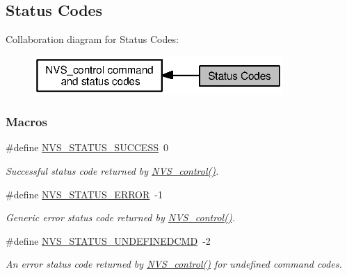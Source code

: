 \subsection{Status Codes}
\label{group___n_v_s___s_t_a_t_u_s}
Collaboration diagram for Status Codes\+:
\nopagebreak
\begin{figure}[H]
\begin{center}
\leavevmode
\includegraphics[width=269pt]{group___n_v_s___s_t_a_t_u_s}
\end{center}
\end{figure}
\subsubsection*{Macros}
\begin{DoxyCompactItemize}
\item 
\#define \hyperlink{group___n_v_s___s_t_a_t_u_s_ga5f3b6583ee909863b86799762dc8b4aa}{N\+V\+S\+\_\+\+S\+T\+A\+T\+U\+S\+\_\+\+S\+U\+C\+C\+E\+S\+S}~0
\begin{DoxyCompactList}\small\item\em Successful status code returned by \hyperlink{_n_v_s_8h_adb26bd05e4f063191411ac5ad968b1d9}{N\+V\+S\+\_\+control()}. \end{DoxyCompactList}\item 
\#define \hyperlink{group___n_v_s___s_t_a_t_u_s_ga995c9896630b7a0cd1662e7be9c4cf34}{N\+V\+S\+\_\+\+S\+T\+A\+T\+U\+S\+\_\+\+E\+R\+R\+O\+R}~-\/1
\begin{DoxyCompactList}\small\item\em Generic error status code returned by \hyperlink{_n_v_s_8h_adb26bd05e4f063191411ac5ad968b1d9}{N\+V\+S\+\_\+control()}. \end{DoxyCompactList}\item 
\#define \hyperlink{group___n_v_s___s_t_a_t_u_s_gac8aa59663f65af4fa564a3a83cd7d6e1}{N\+V\+S\+\_\+\+S\+T\+A\+T\+U\+S\+\_\+\+U\+N\+D\+E\+F\+I\+N\+E\+D\+C\+M\+D}~-\/2
\begin{DoxyCompactList}\small\item\em An error status code returned by \hyperlink{_n_v_s_8h_adb26bd05e4f063191411ac5ad968b1d9}{N\+V\+S\+\_\+control()} for undefined command codes. \end{DoxyCompactList}\end{DoxyCompactItemize}


